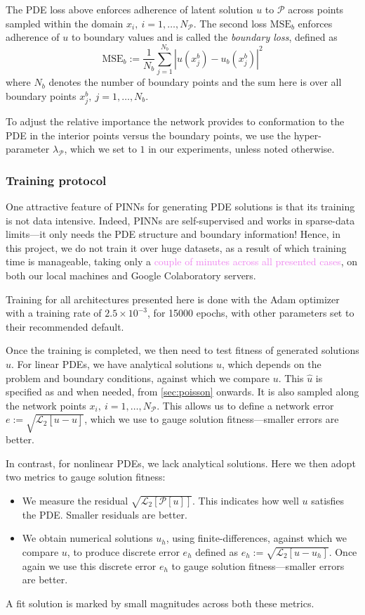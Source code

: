 \documentclass[11pt]{article}
\newcommand{\abs}[1]{\left\lvert#1\right\rvert}
\newcommand{\mse}{\textrm{MSE}}
\newcommand{\pde}{\ensuremath{\mathcal{P}}}
\newcommand{\Ltwo}[1]{\ensuremath{\mathcal{L}_2\left[#1\right]}}
\newcommand{\newcontent}[1]{\textcolor{violet}{#1}}
\begin{document}
The PDE loss above enforces adherence of latent solution \(u\) to \(\pde\) across
points sampled within the domain \(x_i,~i = 1, \dots,  N_\pde\). The second
loss \(\mse_{b}\) enforces adherence of \(u\) to boundary values and is called the
\emph{boundary loss}, defined as
\[ \mse_{b} :=  \frac{1}{N_b}\sum_{j=1}^{N_b} \abs{u(x^b_j) - u_b(x^b_j) }^2\]
where \(N_b\) denotes the number of boundary points and the sum here is
over all boundary points \(x^b_j,~j = 1, \dots,  N_b\).

To adjust the relative importance the network provides to conformation to
the PDE in the interior points versus the boundary points, we use the
hyper-parameter \(\lambda_{\pde}\), which we set to \(1\) in our
experiments, unless noted otherwise.

\subsubsection{Training protocol}
\label{sec:org2ba11e0}
One attractive feature of PINNs for generating PDE solutions is that its training
is not data intensive. Indeed, PINNs are self-supervised and works in
sparse-data limits---it only needs the PDE structure and boundary
information! Hence, in this project, we do not train it over huge datasets,
as a result of which training time is manageable, taking only a
\newcontent{couple of minutes across all presented cases},
on both our local machines and Google Colaboratory servers.

Training for all architectures presented here is done with the Adam
optimizer \cite{kingma2014adam} with a training rate of \(2.5 \times
	10^{-3}\), for 15000 epochs,
with other parameters set to their recommended default.

Once the training is completed, we then need to test fitness of generated
solutions \(u\). For linear PDEs, we have analytical solutions \(\hat{u}\), which depends on the problem and boundary conditions, against
which we compare \(u\). This \(\hat{u}\) is specified as and when needed,
from \cref{sec:poisson} onwards. It is also sampled along the network points \(x_i,~i = 1, \dots,  N_\pde\). This allows us to define a network error \(e := \sqrt{\Ltwo{u - \hat{u}}}\), which we use to gauge solution
fitness---smaller errors are better.

In contrast, for nonlinear PDEs, we lack analytical solutions. Here we then
adopt two metrics to gauge solution fitness:
\begin{itemize}
\item We measure the residual \(\sqrt{\Ltwo{\pde[u]}}\). This indicates how well
\(u\) satisfies the PDE. Smaller residuals are better.
\item We obtain numerical solutions \(u_{h}\), using finite-differences,
against which we compare \(u\), to produce discrete error \(e_h\)
defined as \(e_h := \sqrt{\Ltwo{u - u_{h}}}\). Once again we use this discrete
error \(e_h\) to gauge solution fitness---smaller errors are better.
\end{itemize}
A fit solution is marked by small magnitudes across both these metrics.
\end{document}
